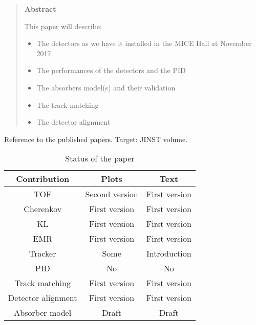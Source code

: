 \begin{quotation}
\begin{center}
\textbf{Abstract}
\end{center}
  \noindent
  This paper will describe:
  \begin{itemize}
    \item The detectors as we have it installed in the MICE Hall at November 2017
    \item The performances of the detectors and the PID
    \item The absorbers model(s) and their validation
    \item The track matching
    \item The detector alignment
  \end{itemize}
\end{quotation}

\noindent

Reference to the published papers.
Target: JINST volume.

\begin{table}[!ht]
  \caption{Status of the paper}
  \label{tab:}

  \begin{center}
    \begin{tabular}{c|c|c}
        \hline
       Contribution         & Plots             & Text\\
       \hline
       TOF                  & Second version    & First version \\
       Cherenkov            & First version     & First version \\
       KL                   & First version     & First version \\
       EMR                  & First version     & First version \\
       Tracker              & Some              & Introduction \\
       PID                  & No                & No \\
       Track matching       & First version     & First version \\
       Detector alignment   & First version     & First version \\
       Absorber model       & Draft             & Draft \\
       
       \hline
    \end{tabular}
  \end{center}
\end{table}
